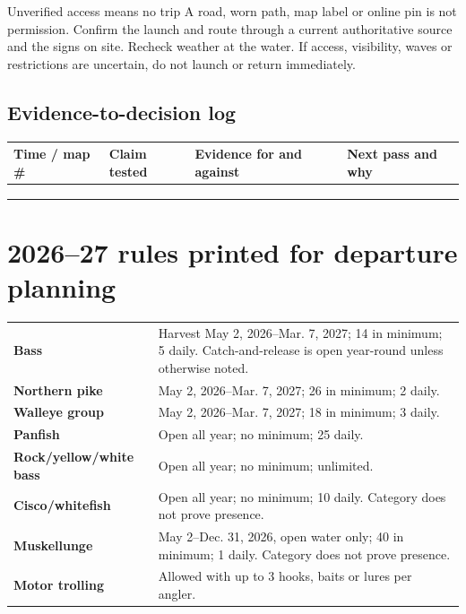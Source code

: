 \begin{teloshazard}{Unverified access means no trip}
A road, worn path, map label or online pin is not permission. Confirm the
launch and route through a current authoritative source and the signs on site.
Recheck weather at the water. If access, visibility, waves or restrictions are
uncertain, do not launch or return immediately.
\end{teloshazard}

\subsection{Evidence-to-decision log}
\begin{tabularx}{\linewidth}{@{}p{.13\linewidth}p{.18\linewidth}X X@{}}
\toprule
Time / map \# & Claim tested & Evidence for and against & Next pass and why\\
\midrule
\rule{0pt}{1.2cm}&&&\\ \midrule
\rule{0pt}{1.2cm}&&&\\ \midrule
\rule{0pt}{1.2cm}&&&\\
\bottomrule
\end{tabularx}

\newpage
\section{2026--27 rules printed for departure planning}

\begin{tabularx}{\linewidth}{@{}>{\bfseries}p{.22\linewidth}X@{}}
\toprule
Bass & Harvest May 2, 2026--Mar. 7, 2027; 14 in minimum; 5 daily.
Catch-and-release is open year-round unless otherwise noted.\\
Northern pike & May 2, 2026--Mar. 7, 2027; 26 in minimum; 2 daily.\\
Walleye group & May 2, 2026--Mar. 7, 2027; 18 in minimum; 3 daily.\\
Panfish & Open all year; no minimum; 25 daily.\\
Rock/yellow/white bass & Open all year; no minimum; unlimited.\\
Cisco/whitefish & Open all year; no minimum; 10 daily. Category does not prove presence.\\
Muskellunge & May 2--Dec. 31, 2026, open water only; 40 in minimum; 1 daily.
Category does not prove presence.\\
Motor trolling & Allowed with up to 3 hooks, baits or lures per angler.\\
\bottomrule
\end{tabularx}

